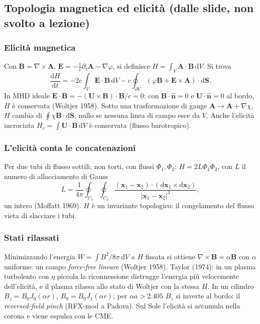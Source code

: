 \subsection{Topologia magnetica ed elicità (dalle slide, non svolto a lezione)}

\subsubsection{Elicità magnetica}
Con $\mathbf{B}=\nabla\times\mathbf{A}$, $\mathbf{E}=-\frac1c\partial_t\mathbf{A}-\nabla\varphi$, si definisce $H=\int_V\mathbf{A}\cdot\mathbf{B}\,\mathrm{d}V$. Si trova
\begin{equation}
\frac{\mathrm{d}H}{\mathrm{d}t}=-2c\int_V\mathbf{E}\cdot\mathbf{B}\,\mathrm{d}V-c\oint_{\partial V}(\varphi\mathbf{B}+\mathbf{E}\times\mathbf{A})\cdot\mathrm{d}\mathbf{S}.
\end{equation}
In MHD ideale $\mathbf{E}\cdot\mathbf{B}=-(\mathbf{U}\times\mathbf{B})\cdot\mathbf{B}/c=0$: con $\mathbf{B}\cdot\hat{\mathbf{n}}=0$ e $\mathbf{U}\cdot\hat{\mathbf{n}}=0$ al bordo, $H$ è conservata (Woltjer 1958). Sotto una trasformazione di gauge $\mathbf{A}\to\mathbf{A}+\nabla\chi$, $H$ cambia di $\oint\chi\mathbf{B}\cdot\mathrm{d}\mathbf{S}$, nullo se nessuna linea di campo esce da $V$. Anche l'elicità incrociata $H_c=\int\mathbf{U}\cdot\mathbf{B}\,\mathrm{d}V$ è conservata (flusso barotropico).

\subsubsection{L'elicità conta le concatenazioni}
Per due tubi di flusso sottili, non torti, con flussi $\Phi_1,\Phi_2$: $H=2L\Phi_1\Phi_2$, con $L$ il numero di allacciamento di Gauss
\begin{equation}
L=\frac{1}{4\pi}\oint_{C_1}\oint_{C_2}\frac{(\mathbf{x}_1-\mathbf{x}_2)\cdot(\mathrm{d}\mathbf{x}_1\times\mathrm{d}\mathbf{x}_2)}{|\mathbf{x}_1-\mathbf{x}_2|^3},
\end{equation}
un intero (Moffatt 1969). $H$ è un invariante topologico: il congelamento del flusso vieta di slacciare i tubi.

\subsubsection{Stati rilassati}
Minimizzando l'energia $W=\int B^2/8\pi\,\mathrm{d}V$ a $H$ fissata si ottiene $\nabla\times\mathbf{B}=\alpha\mathbf{B}$ con $\alpha$ uniforme: un campo \emph{force-free lineare} (Woltjer 1958). Taylor (1974): in un plasma turbolento con $\eta$ piccola la riconnessione distrugge l'energia più velocemente dell'elicità, e il plasma rilassa allo stato di Woltjer con la stessa $H$. In un cilindro $B_z=B_0J_0(\alpha r)$, $B_\theta=B_0J_1(\alpha r)$; per $\alpha a>2.405$ $B_z$ si inverte al bordo: il \emph{reversed-field pinch} (RFX-mod a Padova). Sul Sole l'elicità si accumula nella corona e viene espulsa con le CME.

